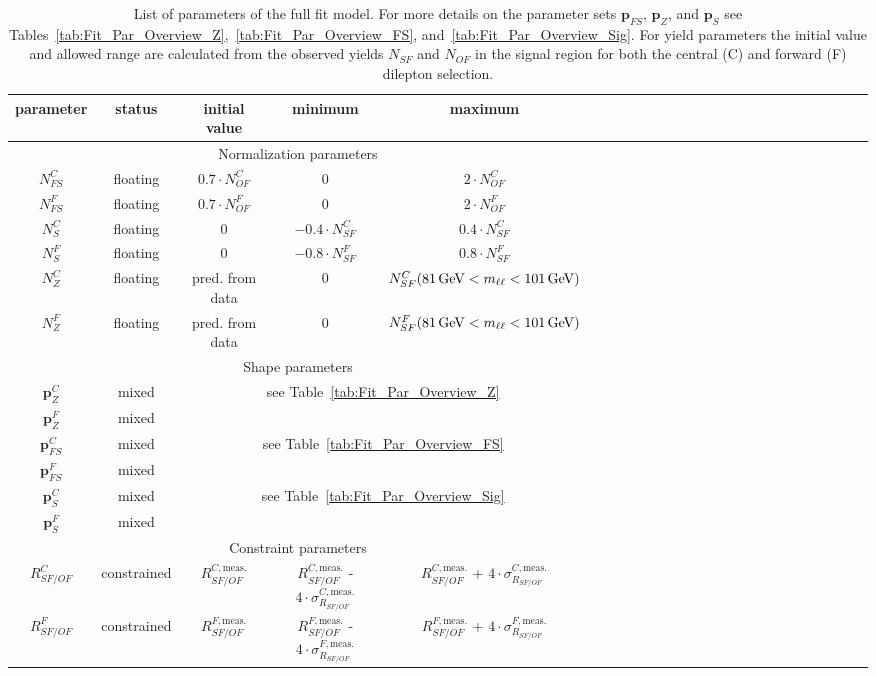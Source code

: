 \begin{table}[htbp]
\begin{center}
 \renewcommand{\arraystretch}{1.3}
 \caption{List of parameters of the full fit model. For more details on the parameter sets $\mathbf{p}_{FS}$, $\mathbf{p}_{Z}$, and $\mathbf{p}_{S}$ see Tables~\ref{tab:Fit_Par_Overview_Z},~\ref{tab:Fit_Par_Overview_FS}, and~\ref{tab:Fit_Par_Overview_Sig}. For yield parameters the initial value and allowed range are calculated from the observed yields $N_{SF}$ and $N_{OF}$ in the signal region for both the central (C) and forward (F) dilepton selection.\label{tab:Fit_Par_Overview_Full}}
\begin{tabular}{c|c|c|c|ccccccccccccccccccccc}
parameter & status & initial value & minimum & maximum \\ \hline
\multicolumn{5}{c}{Normalization parameters}\\ \hline
$N_{FS}^{C}$ & floating & $0.7\cdot N_{OF}^{C}$ & 0 & $2\cdot N_{OF}^{C}$ \\
$N_{FS}^{F}$ & floating & $0.7\cdot N_{OF}^{F}$ & 0 & $2\cdot N_{OF}^{F}$ \\
$N_{S}^{C}$ & floating & 0 &  $-0.4\cdot N_{SF}^{C}$ &  $0.4\cdot N_{SF}^{C}$ \\
$N_{S}^{F}$ & floating & 0 &  $-0.8\cdot N_{SF}^{F}$ &  $0.8\cdot N_{SF}^{F}$ \\
$N_{Z}^{C}$ & floating & pred. from data & 0 & $N_{SF}^{C}(81\,\mathrm{Ge\hspace{-.08em}V} < m_{\ell\ell} < 101\,\mathrm{Ge\hspace{-.08em}V})$ \\
$N_{Z}^{F}$ & floating & pred. from data & 0 & $N_{SF}^{F}(81\,\mathrm{Ge\hspace{-.08em}V} < m_{\ell\ell} < 101\,\mathrm{Ge\hspace{-.08em}V})$ \\ \hline
\multicolumn{5}{c}{Shape parameters} \\ \hline
$\mathbf{p}_{Z}^{C}$ & mixed & \multicolumn{3}{c}{\multirow{2}{*}{see Table~\ref{tab:Fit_Par_Overview_Z}}}\\
$\mathbf{p}_{Z}^{F}$ & mixed & \multicolumn{3}{c}{}\\
$\mathbf{p}_{FS}^{C}$ & mixed & \multicolumn{3}{c}{\multirow{2}{*}{see Table~\ref{tab:Fit_Par_Overview_FS}}}\\
$\mathbf{p}_{FS}^{F}$ & mixed & \multicolumn{3}{c}{}\\
$\mathbf{p}_{S}^{C}$ & mixed & \multicolumn{3}{c}{\multirow{2}{*}{see Table~\ref{tab:Fit_Par_Overview_Sig}}}\\
$\mathbf{p}_{S}^{F}$ & mixed & \multicolumn{3}{c}{}\\ \hline
\multicolumn{5}{c}{Constraint parameters}\\ \hline
$R_{SF/OF}^{C}$ & constrained & $R_{SF/OF}^{C,\text{meas.}}$  & $R_{SF/OF}^{C,\text{meas.}}$ - $4\cdot \sigma_{R_{SF/OF}}^{C,\text{meas.}}$ & $R_{SF/OF}^{C,\text{meas.}}$ + $4\cdot \sigma_{R_{SF/OF}}^{C,\text{meas.}}$ \\
$R_{SF/OF}^{F}$ & constrained & $R_{SF/OF}^{F,\text{meas.}}$  & $R_{SF/OF}^{F,\text{meas.}}$ - $4\cdot \sigma_{R_{SF/OF}}^{F,\text{meas.}}$ & $R_{SF/OF}^{F,\text{meas.}}$ + $4\cdot \sigma_{R_{SF/OF}}^{F,\text{meas.}}$ \\
\end{tabular}

\end{center}
\end{table}


